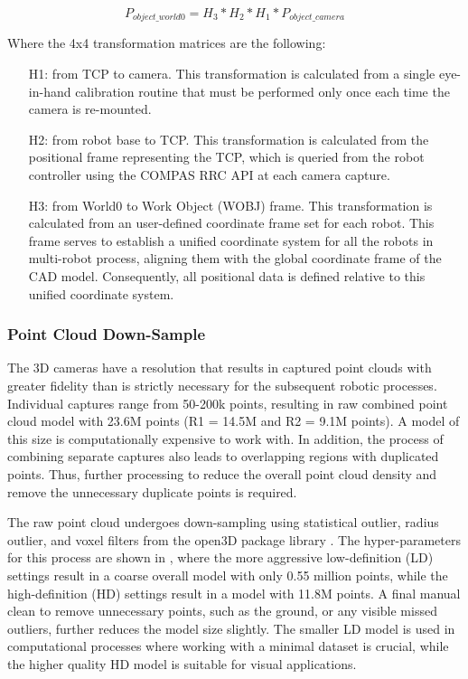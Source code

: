          \begin{equation*}
             P_{object\_world0} = H_3 * H_2 * H_1 * P_{object\_camera}
         \end{equation*}
    
        Where the 4x4 transformation matrices are the following:
    
        \begin{itemize}
            \item [H1:] from TCP to camera. This transformation is calculated from a single eye-in-hand calibration routine that must be performed only once each time the camera is re-mounted.
            \item [H2:] from robot base to TCP. This transformation is calculated from the positional frame representing the TCP, which is queried from the robot controller using the COMPAS RRC API \citep{fleischmann_compas_2020} at each camera capture.
            \item [H3:] from World0 to Work Object (WOBJ) frame. This transformation is calculated from an user-defined coordinate frame set for each robot. This frame serves to establish a unified coordinate system for all the robots in multi-robot process, aligning them with the global coordinate frame of the CAD model. Consequently, all positional data is defined relative to this unified coordinate system.
        \end{itemize}

    \subsubsection{Point Cloud Down-Sample} 
        The 3D cameras have a resolution that results in captured point clouds with greater fidelity than is strictly necessary for the subsequent robotic processes. Individual captures range from 50-200k points, resulting in raw combined point cloud model with 23.6M points (R1 = 14.5M and R2 = 9.1M points). A model of this size is computationally expensive to work with. In addition, the process of combining separate captures also leads to overlapping regions with duplicated points. Thus, further processing to reduce the overall point cloud density and remove the unnecessary duplicate points is required.

        The raw point cloud undergoes down-sampling using statistical outlier, radius outlier, and voxel filters from the open3D package library \citep{zhou_open3d_2018}. The hyper-parameters for this process are shown in , where the more aggressive low-definition (LD) settings result in a coarse overall model with only 0.55 million points, while the high-definition (HD) settings result in a model with 11.8M points. A final manual clean to remove unnecessary points, such as the ground, or any visible missed outliers, further reduces the model size slightly. The smaller LD model is used in computational processes where working with a minimal dataset is crucial, while the higher quality HD model is suitable for visual applications.

